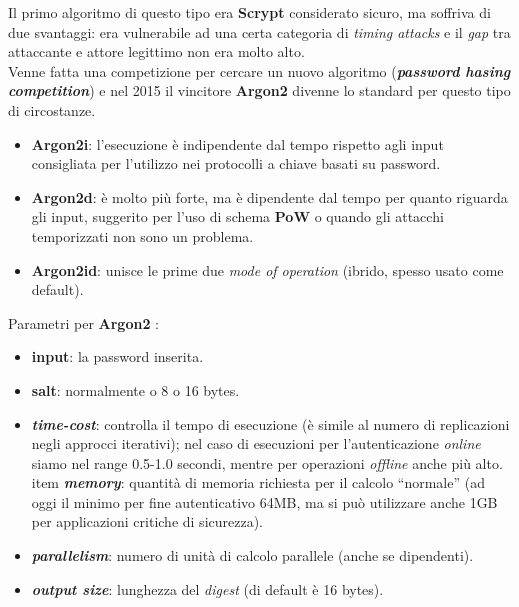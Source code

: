 \begin{flushleft}
    Il primo algoritmo di questo tipo era \textbf{Scrypt} considerato sicuro, ma soffriva di due svantaggi: era vulnerabile ad una certa categoria di \textit{timing attacks} e il \textit{gap} tra attaccante e attore legittimo non era molto alto. \\
    Venne fatta una competizione per cercare un nuovo algoritmo (\textbf{\textit{password hasing competition}}) e nel 2015 il vincitore \textbf{Argon2} divenne lo standard per questo tipo di circostanze.
    \begin{itemize}[nosep]
        \item \textbf{Argon2i}: l'esecuzione è indipendente dal tempo rispetto agli input consigliata per l'utilizzo nei protocolli a chiave basati su password.
        \item \textbf{Argon2d}: è molto più forte, ma è dipendente dal tempo per quanto riguarda gli input, suggerito per l'uso di schema \textbf{PoW} o quando gli attacchi temporizzati non sono un problema.
        \item \textbf{Argon2id}: unisce le prime due \textit{mode of operation} (ibrido, spesso usato come default).
    \end{itemize}
    Parametri per \textbf{Argon2} :
    \begin{itemize}[nosep]
        \item \textbf{input}: la password inserita.
        \item \textbf{salt}: normalmente o 8 o 16 bytes.
        \item \textbf{\textit{time-cost}}: controlla il tempo di esecuzione (è simile al numero di replicazioni negli approcci iterativi); nel caso di esecuzioni per l'autenticazione \textit{online} siamo nel range 0.5-1.0 secondi, mentre per operazioni \textit{offline} anche più alto.
        item \textbf{\textit{memory}}: quantità di memoria richiesta per il calcolo ``normale'' (ad oggi il minimo per fine autenticativo 64MB, ma si può utilizzare anche 1GB per applicazioni critiche di sicurezza).
        \item \textbf{\textit{parallelism}}: numero di unità di calcolo parallele (anche se dipendenti).
        \item \textbf{\textit{output size}}: lunghezza del \textit{digest} (di default è 16 bytes).
    \end{itemize}
\end{flushleft}